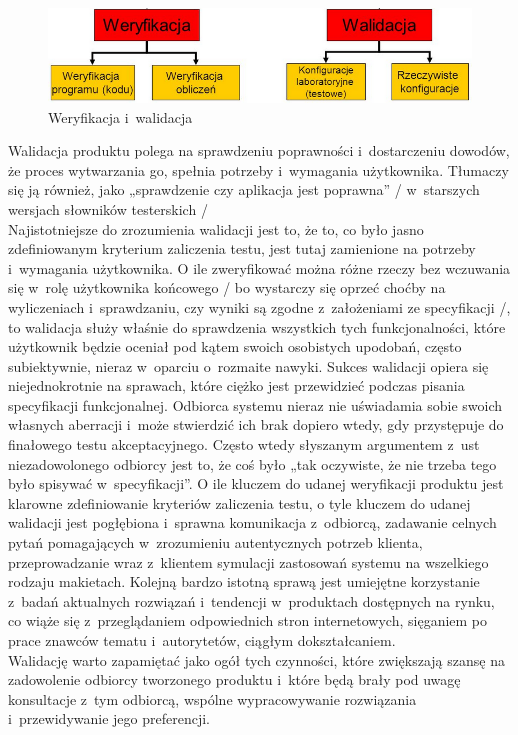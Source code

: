 \documentclass[brudnopis]{xmgr}
\begin{document}
\begin{figure}[th!]
\centering
\includegraphics[width=.7\hsize]{images/weryfikacja_walidacja}
\caption{Weryfikacja i~walidacja\label{RYS.2}}
\end{figure}

\indent \textcolor{sb}{Walidacja produktu polega na} \textcolor{sa}{sprawdzeniu poprawności i~dostarczeniu dowodów,  że proces wytwarzania go, spełnia potrzeby i~wymagania użytkownika. Tłumaczy się ją również, jako „sprawdzenie czy aplikacja jest poprawna” / w~starszych wersjach słowników testerskich /}\cite{ALTKOM}
\\
\indent \textcolor{sb}{Najistotniejsze do zrozumienia walidacji jest to,} \textcolor{sa}{że to, co było jasno zdefiniowanym kryterium zaliczenia testu, jest tutaj zamienione na potrzeby i~wymagania użytkownika.} \textcolor{sb}{O ile zweryfikować można różne rzeczy bez wczuwania się w~rolę użytkownika końcowego / bo wystarczy się oprzeć choćby na wyliczeniach i~sprawdzaniu, czy wyniki są zgodne z~założeniami ze specyfikacji /,} \textcolor{sa}{to walidacja służy właśnie do sprawdzenia wszystkich tych funkcjonalności, które użytkownik będzie oceniał pod kątem swoich osobistych upodobań, często subiektywnie, nieraz w~oparciu o~rozmaite nawyki.}
\textcolor{sb}{Sukces walidacji opiera się niejednokrotnie na sprawach,} \textcolor{sa}{które ciężko jest przewidzieć podczas pisania specyfikacji funkcjonalnej.} \textcolor{sb}{Odbiorca systemu nieraz nie uświadamia sobie swoich własnych aberracji} \textcolor{sa}{i~może stwierdzić ich brak dopiero wtedy, gdy przystępuje do finałowego testu akceptacyjnego.} \textcolor{sb}{Często wtedy słyszanym argumentem z~ust niezadowolonego odbiorcy jest to,} \textcolor{sa}{że coś było „tak oczywiste, że nie trzeba tego było spisywać w~specyfikacji”.}
\textcolor{sb}{O ile kluczem do udanej weryfikacji produktu jest klarowne zdefiniowanie kryteriów zaliczenia testu,} \textcolor{sa}{o tyle kluczem do udanej walidacji jest pogłębiona i~sprawna komunikacja z~odbiorcą, zadawanie celnych pytań pomagających w~zrozumieniu autentycznych potrzeb klienta, przeprowadzanie wraz z~klientem symulacji zastosowań systemu na wszelkiego rodzaju makietach.} \textcolor{sb}{Kolejną bardzo istotną sprawą jest umiejętne korzystanie z~badań aktualnych rozwiązań i~tendencji w~produktach dostępnych na rynku,} \textcolor{sa}{co wiąże się z~przeglądaniem odpowiednich stron internetowych, sięganiem po prace znawców tematu i~autorytetów, ciągłym dokształcaniem.}
\\
\indent \textcolor{sb}{Walidację warto zapamiętać jako ogół tych czynności, które zwiększają szansę na zadowolenie odbiorcy tworzonego produktu i~które będą brały pod uwagę konsultacje z~tym odbiorcą,} \textcolor{sa}{wspólne wypracowywanie rozwiązania i~przewidywanie jego preferencji.}\cite{ALTKOM}
\end{document}
